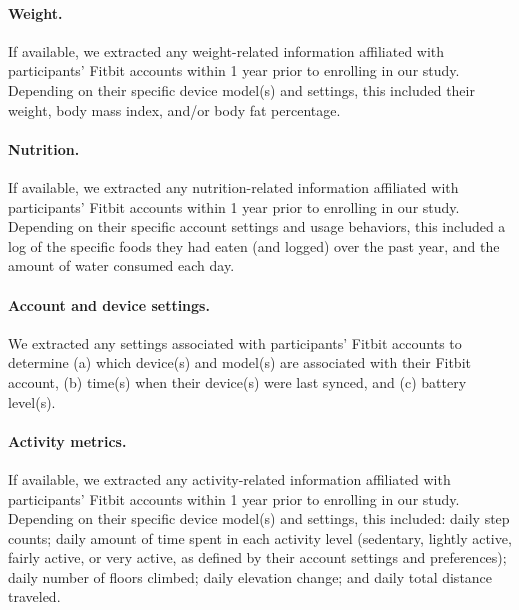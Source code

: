 \documentclass[10pt]{article}
\begin{document}
\paragraph{Weight.}  If available, we extracted any weight-related
information affiliated with participants' Fitbit accounts within 1
year prior to enrolling in our study.  Depending on their specific
device model(s) and settings, this included their weight, body mass
index, and/or body fat percentage.

\paragraph{Nutrition.} If available, we extracted any
nutrition-related information affiliated with participants' Fitbit
accounts within 1 year prior to enrolling in our study. Depending on
their specific account settings and usage behaviors, this included a
log of the specific foods they had eaten (and logged) over the past
year, and the amount of water consumed each day.

\paragraph{Account and device settings.}  We extracted any settings
associated with participants' Fitbit accounts to determine (a) which
device(s) and model(s) are associated with their Fitbit account, (b)
time(s) when their device(s) were last synced, and (c) battery
level(s).

\paragraph{Activity metrics.}  If available, we extracted any
activity-related information affiliated with participants' Fitbit
accounts within 1 year prior to enrolling in our study.  Depending on
their specific device model(s) and settings, this included: daily step
counts; daily amount of time spent in each activity level (sedentary,
lightly active, fairly active, or very active, as defined by their
account settings and preferences); daily number of floors climbed;
daily elevation change; and daily total distance traveled.
\end{document}
